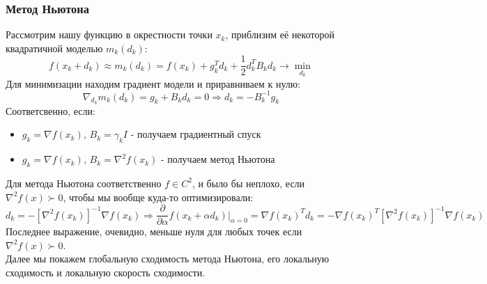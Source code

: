 \subsubsection{Метод Ньютона}
Рассмотрим нашу функцию в окрестности точки $x_k$, приблизим её некоторой квадратичной моделью $m_k(d_k)$:
\[
		f(x_k + d_k) \approx m_k(d_k) = f(x_k) + g_k^{T} d_k + \dfrac{1}{2} d_k^{T} B_k d_k \to \min\limits_{d_k}
\]
Для минимизации находим градиент модели и приравниваем к нулю:
\[
		\nabla_{d_k} m_k(d_k) = g_k + B_k d_k = 0 \Rightarrow d_k = - B_k^{-1} g_k
\]
Соответсвенно, если:
\begin{itemize}
		\item $g_k = \nabla f(x_k), \, B_k = \gamma_k I$ - получаем градиентный спуск
		\item $g_k = \nabla f(x_k), \, B_k = \nabla^2 f(x_k)$ - получаем метод Ньютона
\end{itemize}
Для метода Ньютона соответственно $f \in C^{2}$, и было бы неплохо, если $\nabla^2 f(x) \succ 0$, чтобы мы вообще куда-то оптимизировали:
\[
		d_k = - \left[ \nabla^2 f(x_k) \right]^{-1} \nabla f(x_k) \Rightarrow \dfrac{\partial}{\partial \alpha} f(x_k + \alpha d_k) \Big|_{\alpha = 0} = \nabla f(x_k)^{T} d_k = - \nabla f(x_k)^{T} \left[ \nabla^2 f(x_k) \right]^{-1} \nabla f(x_k)
\]
Последнее выражение, очевидно, меньше нуля для любых точек если $\nabla^2 f(x) \succ 0$. \\
Далее мы покажем глобальную сходимость метода Ньютона, его локальную сходимость и локальную скорость сходимости. \\
